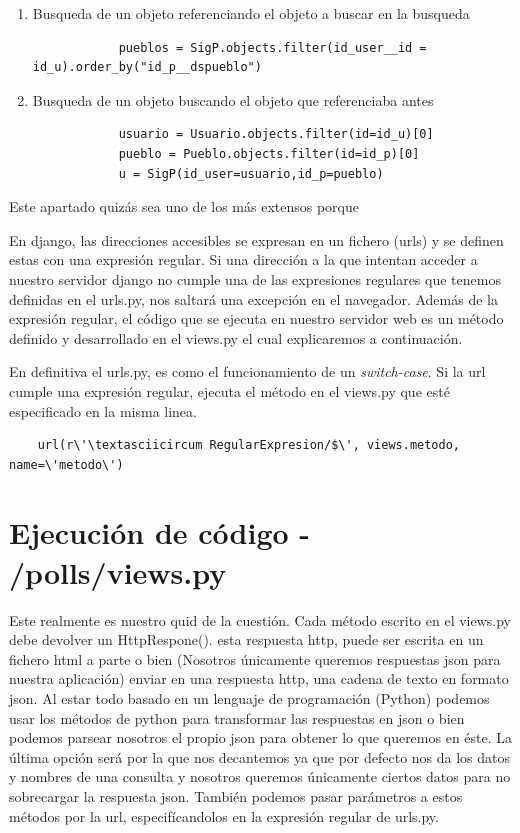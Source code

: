 	\begin{enumerate}
	
		\item Busqueda de un objeto referenciando el objeto a buscar en la busqueda
		\begin{lstlisting}
			pueblos = SigP.objects.filter(id_user__id = id_u).order_by("id_p__dspueblo")
		\end{lstlisting}
		\item Busqueda de un objeto buscando el objeto que referenciaba antes
			\begin{lstlisting}
			usuario = Usuario.objects.filter(id=id_u)[0]
			pueblo = Pueblo.objects.filter(id=id_p)[0]
			u = SigP(id_user=usuario,id_p=pueblo)
		\end{lstlisting}
	\end{enumerate}
	
Este apartado quizás sea uno de los más extensos porque 

	En django, las direcciones accesibles se expresan en un fichero (urls) y se definen estas con una expresión regular. Si una dirección a la que intentan acceder a nuestro servidor django no cumple una de las expresiones regulares que tenemos definidas en el urls.py, nos saltará una excepción en el navegador. Además de la expresión regular, el código que se ejecuta en nuestro servidor web es un método definido y desarrollado en el views.py el cual explicaremos a continuación.
	
	En definitiva el urls.py, es como el funcionamiento de un \textit{switch-case}. Si la url cumple una expresión regular, ejecuta el método en el views.py que esté especificado en la misma linea.
	
\begin{lstlisting}
    url(r\'\textasciicircum RegularExpresion/$\', views.metodo, name=\'metodo\')
\end{lstlisting}	

\section{Ejecución de código - /polls/views.py}
	
	Este realmente es nuestro quid de la cuestión. Cada método escrito en el views.py debe devolver un HttpRespone(). 
	esta respuesta http, puede ser escrita en un fichero html a parte o bien (Nosotros únicamente queremos respuestas json para nuestra aplicación) enviar en una respuesta http, una cadena de texto en formato json.
	Al estar todo basado en un lenguaje de programación (Python) podemos usar los métodos de python para transformar las respuestas en json o bien podemos parsear nosotros el propio json para obtener lo que queremos en éste. 
	La última opción será por la que nos decantemos ya que por defecto nos da los datos y nombres de una consulta y nosotros queremos únicamente ciertos datos para no sobrecargar la respuesta json.
	También podemos pasar parámetros a estos métodos por la url, especifícandolos en la expresión regular de urls.py.
	
